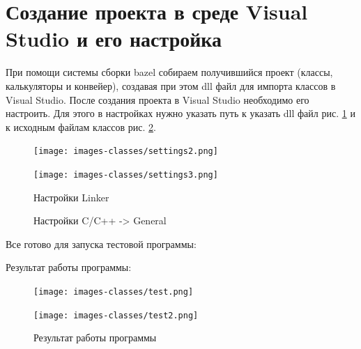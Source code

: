 \documentclass[a4paper,14pt]{extreport}
\begin{document}
        \section{Создание проекта в среде Visual Studio и его настройка}
        При помощи системы сборки bazel собираем получившийся проект (классы, калькуляторы и конвейер), создавая при этом dll файл для импорта классов в Visual Studio. После создания проекта в Visual Studio необходимо его настроить. Для этого в настройках нужно указать путь к указать dll файл рис. \ref{ris:settings1} и к исходным файлам классов рис. \ref{ris:settings2}.
        \begin{figure}[h]
            \begin{center}
                \begin{minipage}[h]{0.49\linewidth}
                    \texttt{[image: images-classes/settings2.png]}
                \end{minipage}
                \hfill 
                \begin{minipage}[h]{0.49\linewidth}
                    \texttt{[image: images-classes/settings3.png]}
                \end{minipage}
            \end{center}
            \caption{Настройки Linker}
            \label{ris:settings1}
        \end{figure}
        \begin{figure}[H]
            \caption{Настройки C/C++ -> General}
            \label{ris:settings2}
        \end{figure}

        Все готово для запуска тестовой программы:
        

        Результат работы программы:
        \begin{figure}[h]
            \begin{center}
                \begin{minipage}[h]{0.49\linewidth}
                    \texttt{[image: images-classes/test.png]}
                \end{minipage}
                \hfill 
                \begin{minipage}[h]{0.49\linewidth}
                    \texttt{[image: images-classes/test2.png]}
                \end{minipage}
            \end{center}
            \caption{Результат работы программы}
            \label{ris:test}
        \end{figure}
        
\end{document}
